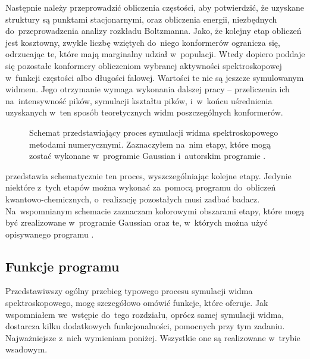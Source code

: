 Następnie należy przeprowadzić obliczenia częstości, aby potwierdzić, że uzyskane
  struktury są punktami stacjonarnymi, oraz obliczenia energii, niezbędnych do~przeprowadzenia
  analizy rozkładu Boltzmanna.
Jako, że kolejny etap obliczeń jest kosztowny,
  zwykle liczbę wziętych do~niego konformerów ogranicza się, odrzucając te, które mają marginalny
  udział w~populacji.
Wtedy dopiero poddaje się pozostałe konformery obliczeniom wybranej aktywności spektroskopowej
  w~funkcji częstości albo długości falowej.
Wartości te nie są jeszcze symulowanym widmem.
Jego otrzymanie wymaga wykonania dalszej pracy \--- przeliczenia ich na~intensywność pików,
  symulacji kształtu pików, i~w~końcu uśrednienia uzyskanych w~ten sposób teoretycznych widm
  poszczególnych konformerów.

\begin{figure}
  
  \caption{
    Schemat przedstawiający proces symulacji widma spektroskopowego metodami numerycznymi.
    Zaznaczyłem na~nim etapy, które mogą zostać wykonane w~programie Gaussian i~autorskim
      programie \tesliper{}.
  }\label{fig:simulation-flow}
\end{figure}

 przedstawia schematycznie ten proces, wyszczególniając kolejne etapy.
Jedynie niektóre z~tych etapów można wykonać za~pomocą programu do~obliczeń kwantowo-chemicznych,
  o~realizację pozostałych musi zadbać badacz.
Na~wspomnianym schemacie zaznaczam kolorowymi obszarami etapy, które mogą być zrealizowane
  w~programie Gaussian oraz te, w~których można użyć opisywanego programu \tesliper{}.

\subsection{Funkcje programu}\label{essence:features}
Przedstawiwszy ogólny przebieg typowego procesu symulacji widma spektroskopowego,
  mogę szczegółowo omówić funkcje, które \tesliper{} oferuje.
Jak wspomniałem we~wstępie do~tego rozdziału, oprócz samej symulacji widma, \tesliper{}
  dostarcza kilku dodatkowych funkcjonalności, pomocnych przy tym zadaniu.
Najważniejsze z~nich wymieniam poniżej.
Wszystkie one są realizowane w~trybie wsadowym.  

